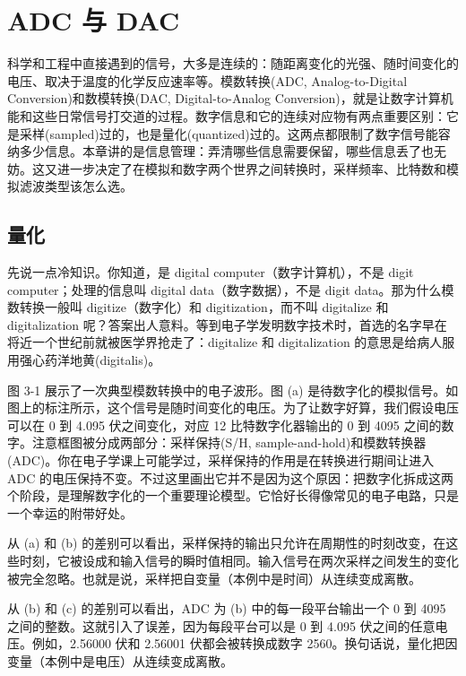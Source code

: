
\chapter{ADC 与 DAC}\label{ch-03}

科学和工程中直接遇到的信号，大多是连续的：随距离变化的光强、随时间变化的电压、取决于温度的化学反应速率等。模数转换(ADC,
Analog-to-Digital Conversion)和数模转换(DAC, Digital-to-Analog
Conversion)，就是让数字计算机能和这些日常信号打交道的过程。数字信息和它的连续对应物有两点重要区别：它是采样(sampled)过的，也是量化(quantized)过的。这两点都限制了数字信号能容纳多少信息。本章讲的是信息管理：弄清哪些信息需要保留，哪些信息丢了也无妨。这又进一步决定了在模拟和数字两个世界之间转换时，采样频率、比特数和模拟滤波类型该怎么选。

\section{量化}

先说一点冷知识。你知道，是 digital computer（数字计算机），不是 digit
computer；处理的信息叫 digital data（数字数据），不是 digit
data。那为什么模数转换一般叫 digitize（数字化）和 digitization，而不叫
digitalize 和 digitalization
呢？答案出人意料。等到电子学发明数字技术时，首选的名字早在将近一个世纪前就被医学界抢走了：digitalize
和 digitalization 的意思是给病人服用强心药洋地黄(digitalis)。

图 3-1 展示了一次典型模数转换中的电子波形。图 (a)
是待数字化的模拟信号。如图上的标注所示，这个信号是随时间变化的电压。为了让数字好算，我们假设电压可以在
0 到 4.095 伏之间变化，对应 12 比特数字化器输出的 0 到 4095
之间的数字。注意框图被分成两部分：采样保持(S/H,
sample-and-hold)和模数转换器(ADC)。你在电子学课上可能学过，采样保持的作用是在转换进行期间让进入
ADC
的电压保持不变。不过这里画出它并不是因为这个原因：把数字化拆成这两个阶段，是理解数字化的一个重要理论模型。它恰好长得像常见的电子电路，只是一个幸运的附带好处。

从 (a) 和 (b)
的差别可以看出，采样保持的输出只允许在周期性的时刻改变，在这些时刻，它被设成和输入信号的瞬时值相同。输入信号在两次采样之间发生的变化被完全忽略。也就是说，采样把自变量（本例中是时间）从连续变成离散。

从 (b) 和 (c) 的差别可以看出，ADC 为 (b) 中的每一段平台输出一个 0 到
4095 之间的整数。这就引入了误差，因为每段平台可以是 0 到 4.095
伏之间的任意电压。例如，2.56000 伏和 2.56001 伏都会被转换成数字
2560。换句话说，量化把因变量（本例中是电压）从连续变成离散。


